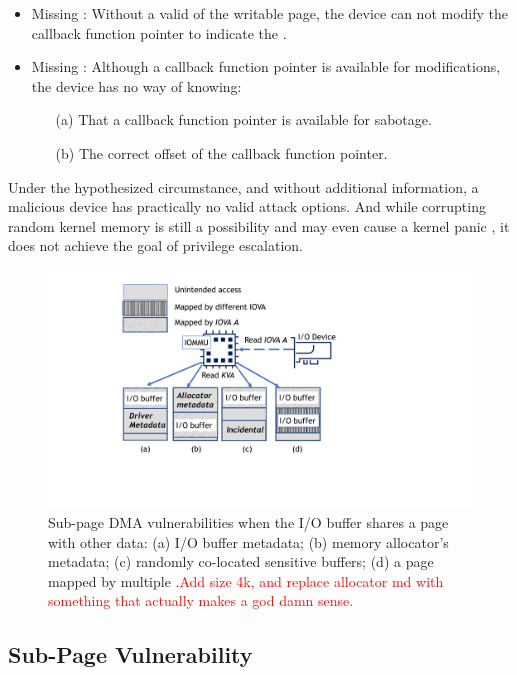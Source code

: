 \begin{itemize}
    \item Missing \means: Without a valid \kva{} of the writable page, the device can not modify the callback function pointer to indicate the \mabaf.
    \item Missing \oportunity: Although a callback function pointer is available for modifications, the device has no way of knowing: 
    \begin{enumerate}
        \item[(a)] That a callback function pointer is available for sabotage.
        \item[(b)] The correct offset of the callback function pointer.
    \end{enumerate}
\end{itemize}

Under the hypothesized circumstance, and without additional information, a malicious device has practically no valid attack options. 
And while corrupting random kernel memory is still a possibility and may even cause a kernel panic \cite{MMT16}, it does not achieve the goal of privilege escalation.

\begin{figure}[t]
    \centering
    \includegraphics[width=1\columnwidth]{figs/subpage.pdf}
    \caption{Sub-page DMA vulnerabilities when the I/O buffer shares a page with other data: (a) I/O buffer metadata; (b) memory allocator’s
metadata; (c) randomly co-located sensitive buffers; (d) a page mapped by multiple \iova.\textcolor{red}{Add size 4k, and replace allocator md with something that actually makes a god damn sense.}}
    \label{fig:colocation}
\end{figure}

\subsection{Sub-Page Vulnerability}\label{sec:subpage}

